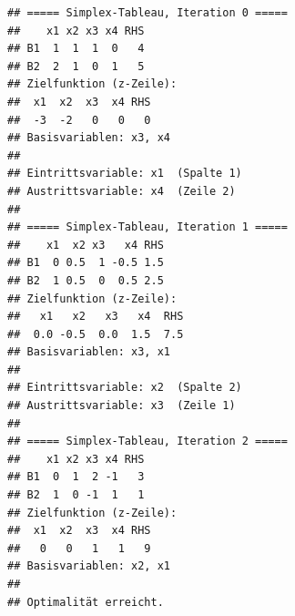 \documentclass[
]{article}
\newenvironment{Shaded}{\begin{snugshade}}{\end{snugshade}}
\newcommand{\AttributeTok}[1]{\textcolor[rgb]{0.13,0.29,0.53}{#1}}
\newcommand{\CommentTok}[1]{\textcolor[rgb]{0.56,0.35,0.01}{\textit{#1}}}
\newcommand{\ControlFlowTok}[1]{\textcolor[rgb]{0.13,0.29,0.53}{\textbf{#1}}}
\newcommand{\DecValTok}[1]{\textcolor[rgb]{0.00,0.00,0.81}{#1}}
\newcommand{\FunctionTok}[1]{\textcolor[rgb]{0.13,0.29,0.53}{\textbf{#1}}}
\newcommand{\NormalTok}[1]{#1}
\newcommand{\OtherTok}[1]{\textcolor[rgb]{0.56,0.35,0.01}{#1}}
\newcommand{\SpecialCharTok}[1]{\textcolor[rgb]{0.81,0.36,0.00}{\textbf{#1}}}
\newcommand{\StringTok}[1]{\textcolor[rgb]{0.31,0.60,0.02}{#1}}
\begin{document}
\begin{Shaded}
\end{Shaded}

\begin{verbatim}
## ===== Simplex-Tableau, Iteration 0 =====
##    x1 x2 x3 x4 RHS
## B1  1  1  1  0   4
## B2  2  1  0  1   5
## Zielfunktion (z-Zeile):
##  x1  x2  x3  x4 RHS 
##  -3  -2   0   0   0 
## Basisvariablen: x3, x4 
## 
## Eintrittsvariable: x1  (Spalte 1)
## Austrittsvariable: x4  (Zeile 2)
## 
## ===== Simplex-Tableau, Iteration 1 =====
##    x1  x2 x3   x4 RHS
## B1  0 0.5  1 -0.5 1.5
## B2  1 0.5  0  0.5 2.5
## Zielfunktion (z-Zeile):
##   x1   x2   x3   x4  RHS 
##  0.0 -0.5  0.0  1.5  7.5 
## Basisvariablen: x3, x1 
## 
## Eintrittsvariable: x2  (Spalte 2)
## Austrittsvariable: x3  (Zeile 1)
## 
## ===== Simplex-Tableau, Iteration 2 =====
##    x1 x2 x3 x4 RHS
## B1  0  1  2 -1   3
## B2  1  0 -1  1   1
## Zielfunktion (z-Zeile):
##  x1  x2  x3  x4 RHS 
##   0   0   1   1   9 
## Basisvariablen: x2, x1 
## 
## Optimalität erreicht.
\end{verbatim}

\begin{Shaded}
\end{Shaded}
\end{document}
